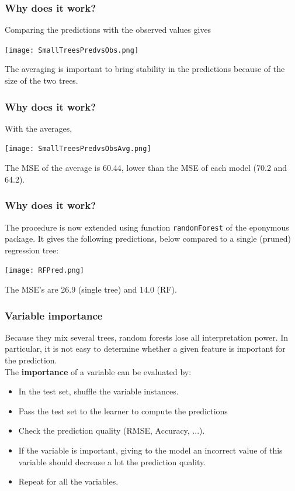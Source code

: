 \begin{frame}
\frametitle{Why does it work?}
Comparing the predictions with the observed values gives
\begin{center}
\texttt{[image: SmallTreesPredvsObs.png]}
\end{center}
The averaging is important to bring stability in the predictions because of the size of the two trees.
\end{frame}
\begin{frame}
\frametitle{Why does it work?}
With the averages,
\begin{center}
\texttt{[image: SmallTreesPredvsObsAvg.png]}
\end{center}
The MSE of the average is 60.44, lower than the MSE of each model (70.2 and 64.2).
\end{frame}
\begin{frame}
\frametitle{Why does it work?}
The procedure is now extended using function {\tt randomForest} of the eponymous package. It gives the following predictions, below compared to a single (pruned) regression tree:
\begin{center}
\texttt{[image: RFPred.png]}
\end{center}
The MSE's are 26.9 (single tree) and 14.0 (RF).
\end{frame}
\begin{frame}
\frametitle{Variable importance}
Because they mix several trees, random forests lose all interpretation power. In particular, it is not easy to determine whether a given feature is important for the prediction.\\
\vspace{0.3cm}
The {\bf importance} of a variable can be evaluated by:
\begin{itemize}
\item In the test set, shuffle the variable instances.
\item Pass the test set to the learner to compute the predictions
\item Check the prediction quality (RMSE, Accuracy, ...).
\item If the variable is important, giving to the model an incorrect value of this variable should decrease a lot the prediction quality. 
\item Repeat for all the variables.
\end{itemize}
\end{frame}
